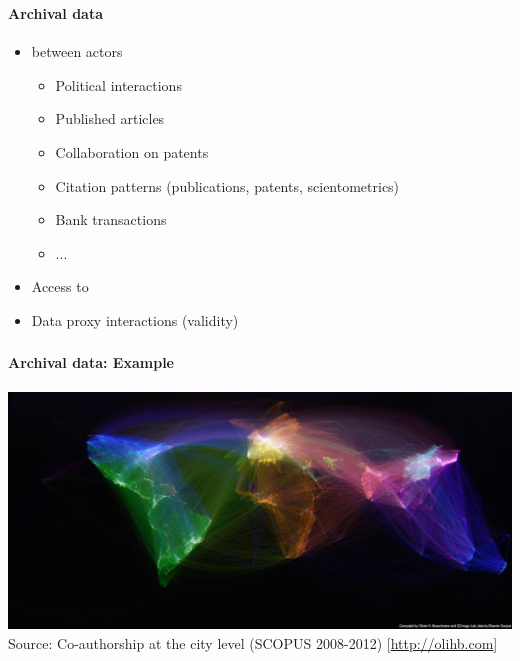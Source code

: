 \documentclass[8pt]{beamer}
\begin{document}
\begin{frame}
\frametitle{\insertsection}
\framesubtitle{Archival data}

\begin{itemize}
\item {\color{blue}{Records of interactions}} between actors
    \begin{itemize}
    \item Political interactions
    \item Published articles
    \item Collaboration on patents
    \item Citation patterns (publications, patents, scientometrics) 
    \item Bank transactions
    \item ...
    \end{itemize}
   
\item Access to {\color{blue}{large datasets}}
\item Data proxy interactions (validity)
\end{itemize}

\end{frame}


\begin{frame}
\frametitle{\insertsection}
\framesubtitle{Archival data: Example}
\centering
\includegraphics[width=\linewidth,height=0.8\textheight,keepaspectratio]{collaboration}\\     
\tiny Source: Co-authorship at the city level (SCOPUS 2008-2012) [\url{http://olihb.com}]
\end{frame}

\end{document}
